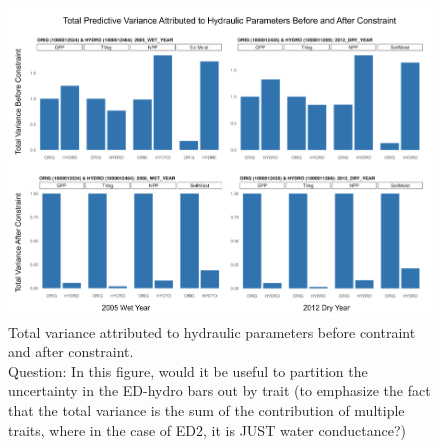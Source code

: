 \begin{figure}[!h]
    \centering
    \includegraphics[width=.9\textwidth]{Hydro_Paper_LaTeX/Hydro_Paper_Figures/variance_before_after.png}
    \caption[Hydraulic variance]{Total variance attributed to hydraulic parameters before contraint and after constraint.\\
    Question: In this figure, would it be useful to partition the uncertainty in the ED-hydro bars out by trait (to emphasize the fact that the total variance is the sum of the contribution of multiple traits, where in the case of ED2, it is JUST water conductance?)}
    \label{fig:constraint_var}
\end{figure}